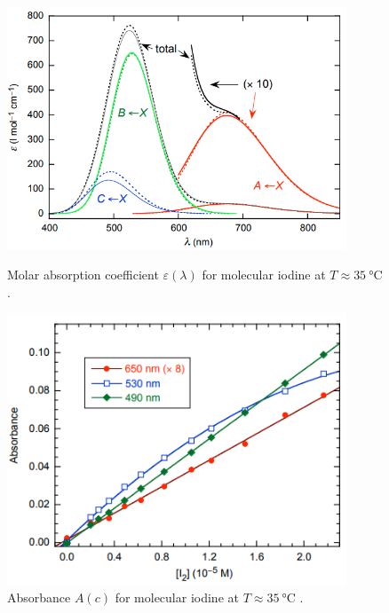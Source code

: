 \begin{figure}[H]
    \centering
    \begin{minipage}[b]{0.49\textwidth}
        \centering
        \includegraphics[width=0.9\textwidth]{graphics/literature-epsilon.png}
        \caption{Molar absorption coefficient $\varepsilon(\lambda)$ for molecular iodine at $T \approx \SI{35}{\celsius}$ \cite{tellinghuisen2011least}.}
        \label{fig:discussion:epsilon}
    \end{minipage}
    \hfill
     \begin{minipage}[b]{0.44\textwidth}
        \centering
        \includegraphics[width=0.9\textwidth]{graphics/literature-concentration.png}
        \caption{Absorbance $A(c)$ for molecular iodine at $T \approx \SI{35}{\celsius}$ \cite{tellinghuisen2011least}.}
        \label{fig:discussion:concentration}
    \end{minipage}
\end{figure}


